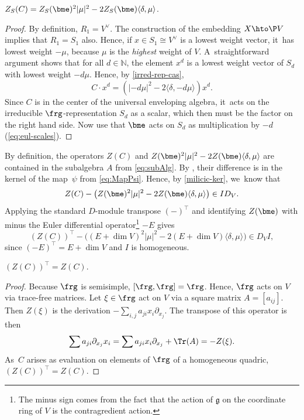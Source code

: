 \begin{lem}\label{C-vs-e-on-S}
$Z_S(C) = Z_S(\bme)^2|\mu|^2 - 2Z_S(\bme)\langle\delta,\mu\rangle$.
\end{lem}

\begin{proof}
By definition, $R_1=V^\vee$. The construction of the embedding $X\hto \P V$ implies that $R_1=S_1$ also. Hence, if $x\in S_1\cong V^\vee$ is a
lowest weight vector, it~has
lowest weight $-\mu$, because $\mu$ is the \emph{highest} weight of $V$. A~straightforward argument shows that for all $d\in \mathbb{N}$, the element $x^d$ is a
lowest weight vector of $S_d$ with
lowest weight $-d\mu$.
Hence, by \cref{irred-rep-cas},
\[
C\cdot x^d = (|-d\mu|^2 - 2\langle\delta, -d\mu\rangle)x^d.
\]
Since $C$ is in the center of the universal enveloping algebra, it~acts on the irreducible $\frg$-representation $S_d$ as a scalar, which then must be the factor on the right hand side. Now use that $\bme$ acts on $S_d$ as multiplication by $-d$ (\cref{eq:eul-scales}).
\end{proof}

By definition, the operators $Z(C)$ and $Z(\bme)^2|\mu|^2 - 2Z(\bme)\langle\delta,\mu\rangle$ are contained in the subalgebra $A$ from \eqref{eq:subAlg}. By , their difference is in the kernel of the map~$\psi$ from \eqref{eq:MapPsi}. Hence, by \cref{milicic-ker}, we~know that
\[
Z(C) - \bigl(Z(\bme)^2|\mu|^2 - 2Z(\bme)\langle\delta,\mu\rangle\bigr) \in I D_V.
\]
Applying the standard $D$\nobreakdash-mod\-ule transpose $(-)^\top$ and identifying $Z(\bme)$ with minus the Euler differential operator\footnote{The minus sign comes from the fact that the action of $\mathfrak{g}$ on the coordinate ring of $V$ is the contragredient action.} $-E$ gives\vspace*{-3pt}
\begin{equation}\label{eq:ZZtop}
(Z(C))^\top - \bigl((E+\dim{V})^2|\mu|^2 - 2(E+\dim{V})\langle\delta,\mu\rangle\bigr)\in D_V I,
\end{equation}
since $(-E)^\top=E+\dim V$ and $I$ is homogeneous.

\begin{lem}\label{ZZtop}
$(Z(C))^\top = Z(C)$.
\end{lem}

\begin{proof}
Because $\frg$ is semisimple, $[\frg,\frg]=\frg$. Hence, $\frg$ acts on $V$ via trace-free matrices. Let $\xi\in \frg$ act on $V$ via a square matrix $A=[a_{ij}]$. Then $Z(\xi)$ is the derivation $-\sum_{i,j}a_{ji}x_i\partial_{x_j}$. The transpose of this operator is then\vspace*{-3pt}
\[
\sum a_{ji}\partial_{x_j} x_i = \sum a_{ji} x_i \partial_{x_j} +\Tr(A) = -Z(\xi).
\]
As~$C$ arises as evaluation on elements of $\frg$ of a homogeneous quadric, $(Z(C))^\top=Z(C)$.
\end{proof}

